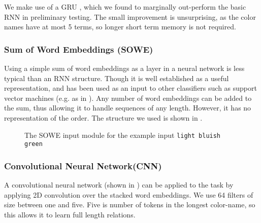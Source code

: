 \documentclass[]{book}
\newcommand{\parencite}{\citep}
\newcommand{\textcite}{\citet}
\newcommand{\natlang}[1]{\texttt{#1}}
\begin{document}
We make use of a GRU \parencite{cho2014properties},
which we found to marginally out-perform the basic RNN in preliminary testing.
The small improvement is unsurprising, as the color names have at most 5 terms,
so longer short term memory is not required.


\subsubsection{Sum of Word Embeddings (SOWE)}\label{sec:sowemod}
Using a simple sum of word embeddings as a layer in a neural network is less typical than an RNN structure.
Though it is well established as a useful representation, and has been used as an input to other classifiers such as support vector machines (e.g. as in \textcite{White2015SentVecMeaning,novelperspective}).
Any number of word embeddings can be added to the sum, thus allowing it to handle sequences of any length.
However, it has no representation of the order.
The structure we used is shown in .

\begin{figure}
	
	\caption{The SOWE input module for the example input \natlang{light bluish green}}
	\label{fig:sowemod}
\end{figure}



\subsubsection{Convolutional Neural Network(CNN)}\label{sec:cnnmod}
A convolutional neural network (shown in ) can be applied to the task by applying 2D convolution over the stacked word embeddings.
We use 64 filters of size between one and five.
Five is number of tokens in the longest color-name,
so this allows it to learn full length relations.
\end{document}
